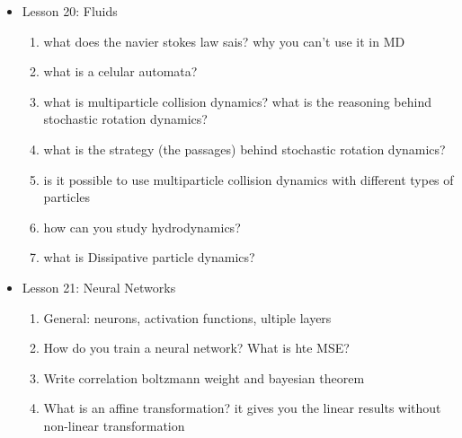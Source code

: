{\begin{itemize}
\begin{enumerate}
        \item Is it possible to have a system with same density and pressure?
        \item what type of advantage you have by using a multi-resolution scheme in the water-gas model?
        \item how do you measure normally the chemical potential? how can you use the multi-resolution scheme to improve it?
        \item what is the fast calculation of solvation energy process?
        \item what can you also investigate with the multi-resolution models? of proteins
        \item what is a dual resolution? what are the main problems?
        \item how you solve them?
        \item what is the problem that you encounter in the previous point?
        \item what can you solve with both the methods?
    \end{enumerate}
    \item Lesson 20: Fluids
    \begin{enumerate}
        \item what does the navier stokes law sais? why you can't use it in MD
        \item what is a celular automata?
        \item what is multiparticle collision dynamics? what is the reasoning behind stochastic rotation dynamics?
        \item what is the strategy (the passages) behind stochastic rotation dynamics?
        \item is it possible to use multiparticle collision dynamics with different types of particles
        \item how can you study hydrodynamics?
        \item what is Dissipative particle dynamics?
    \end{enumerate}
    \item Lesson 21: Neural Networks
    \begin{enumerate}
    	\item General: neurons, activation functions, ultiple layers
    	\item How do you train a neural network? What is hte MSE?
    	\item Write correlation boltzmann weight and bayesian theorem
    	\item What is an affine transformation? it gives you the linear results without non-linear transformation

\end{enumerate}
\end{itemize}}
